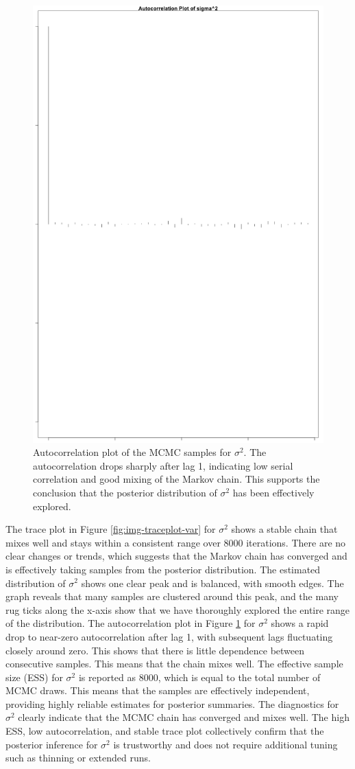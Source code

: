 \documentclass[]{article}
\begin{document}
\begin{figure}[H]
	\centering
	\includegraphics[width=0.7\linewidth]{img/img-autocorr-varpng}
    \caption{Autocorrelation plot of the MCMC samples for $\sigma^2$. The autocorrelation drops sharply after lag 1, indicating low serial correlation and good mixing of the Markov chain. This supports the conclusion that the posterior distribution of $\sigma^2$ has been effectively explored.}
	\label{fig:img-autocorr-varpng}
\end{figure}


The trace plot in Figure \ref{fig:img-traceplot-var} for $\sigma^2$ shows a stable chain that mixes well and stays within a consistent range over 8000 iterations. There are no clear changes or trends, which suggests that the Markov chain has converged and is effectively taking samples from the posterior distribution.
The estimated distribution of $\sigma^2$ shows one clear peak and is balanced, with smooth edges. The graph reveals that many samples are clustered around this peak, and the many rug ticks along the x-axis show that we have thoroughly explored the entire range of the distribution.
The autocorrelation plot in Figure \ref{fig:img-autocorr-varpng} for $\sigma^2$ shows a rapid drop to near-zero autocorrelation after lag 1, with subsequent lags fluctuating closely around zero. This shows that there is little dependence between consecutive samples. This means that the chain mixes well.
The effective sample size (ESS) for $\sigma^2$ is reported as 8000, which is equal to the total number of MCMC draws. This means that the samples are effectively independent, providing highly reliable estimates for posterior summaries.
The diagnostics for $\sigma^2$ clearly indicate that the MCMC chain has converged and mixes well. The high ESS, low autocorrelation, and stable trace plot collectively confirm that the posterior inference for $\sigma^2$ is trustworthy and does not require additional tuning such as thinning or extended runs.
\end{document}
